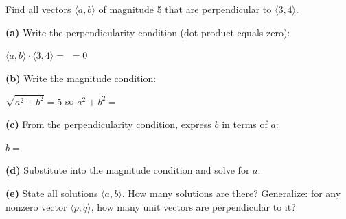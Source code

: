 \documentclass[10pt]{article}
\begin{document}
\begin{tcolorbox}[colback=white, colframe=black!40,
    title=\textbf{Tier E --- Extension},
    fonttitle=\bfseries, arc=2mm, left=3mm, right=3mm, top=2mm, bottom=2mm]
\small
Find all vectors $\langle a, b\rangle$ of magnitude 5 that are perpendicular to
$\langle 3, 4\rangle$.

\textbf{(a)} Write the perpendicularity condition (dot product equals zero):

\vspace{0.06in}
\hspace{1em} $\langle a,b\rangle \cdot \langle 3,4\rangle = $ \blank{4cm} $= 0$

\vspace{0.14in}
\textbf{(b)} Write the magnitude condition:

\vspace{0.06in}
\hspace{1em} $\sqrt{a^2 + b^2} = 5$ \quad so \quad $a^2 + b^2 = $ \blank{2cm}

\vspace{0.14in}
\textbf{(c)} From the perpendicularity condition, express $b$ in terms of $a$:

\vspace{0.06in}
\hspace{1em} $b = $ \blank{5cm}

\vspace{0.14in}
\textbf{(d)} Substitute into the magnitude condition and solve for $a$:


\textbf{(e)} State all solutions $\langle a,b\rangle$. How many solutions are there?
Generalize: for any nonzero vector $\langle p,q\rangle$, how many unit vectors are
perpendicular to it?

\end{tcolorbox}
\end{document}
